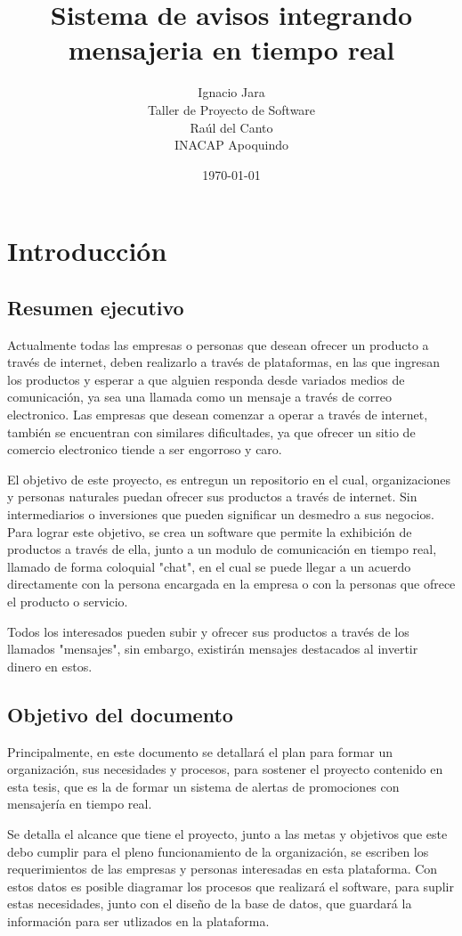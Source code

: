 \documentclass[letterpaper,openright,10pt,twoside]{report}
\title{\textbf{Sistema de avisos integrando mensajeria en tiempo real}}
\author{Ignacio Jara\\Taller de Proyecto de Software\\Raúl del Canto\\INACAP Apoquindo}
\date{\today}
\begin{document}




\part{Introducción}
\chapter*{Resumen ejecutivo}
	Actualmente todas las empresas o personas que desean ofrecer un producto a través de internet, deben realizarlo a través de plataformas, en las que ingresan los productos y esperar a que alguien responda desde variados medios de comunicación, ya sea una llamada como un mensaje a través de correo electronico. Las empresas que desean comenzar a operar a través de internet, también se encuentran con similares dificultades, ya que ofrecer un sitio de comercio electronico tiende a ser engorroso y caro.
	

	El objetivo de este proyecto, es entregun un repositorio en el cual, organizaciones y personas naturales puedan ofrecer sus productos a través de internet. Sin intermediarios o inversiones que pueden significar un desmedro a sus negocios.
	Para lograr este objetivo, se crea un software que permite la exhibición de productos a través de ella, junto a un modulo de comunicación en tiempo real, llamado de forma coloquial "chat", en el cual se puede llegar a un acuerdo directamente con la persona encargada en la empresa o con la personas que ofrece el producto o servicio.
	
	Todos los interesados pueden subir y ofrecer sus productos a través de los llamados "mensajes", sin embargo, existirán mensajes destacados al invertir dinero en estos.
	\chapter*{Objetivo del documento}
	Principalmente, en este documento se detallará el plan para formar un organización, sus necesidades y procesos, para sostener el proyecto contenido en esta tesis, que es la de formar un sistema de alertas de promociones con mensajería en tiempo real.
	
	Se detalla el alcance que tiene el proyecto, junto a las metas y objetivos que este debo cumplir para el pleno funcionamiento de la organización, se escriben los requerimientos de las empresas y personas interesadas en esta plataforma. Con estos datos es posible diagramar los procesos que realizará el software, para suplir estas necesidades, junto con el diseño de la base de datos, que guardará la información para ser utlizados en la plataforma.
	
\end{document}
